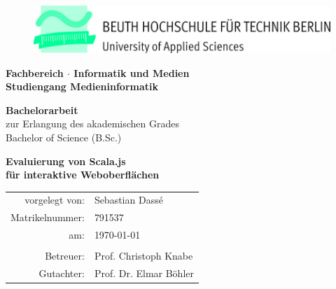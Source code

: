 \begin{titlepage}
\begin{center}
	\begin{figure}[!h]
		\includegraphics[scale=1]{./title/Beuth_Logo_horizontal.jpg}
	\end{figure}

	\vspace{15mm}

	\large
		\textbf{Fachbereich  $\cdot$ Informatik und Medien\\[3mm]
		Studiengang Medieninformatik}\\

	\vspace{15mm}

	\Large
		\textbf{Bachelorarbeit}\\[5mm]
	\normalsize
		zur Erlangung des akademischen Grades\\
		Bachelor of Science (B.Sc.)\\

	\vspace{15mm}

	\huge
		\textbf{Evaluierung von Scala.js \\
		für interaktive Weboberflächen }\\[2cm]
	

	\normalsize
	\begin{tabular}{rl}
		vorgelegt von: & Sebastian Dassé \\
		Matrikelnummer: & 791537 \\
		am: & \today \\
		& \\
		Betreuer: & Prof. Christoph Knabe\\
		Gutachter: & Prof. Dr. Elmar Böhler\\
	\end{tabular}\\
\end{center}
\end{titlepage}